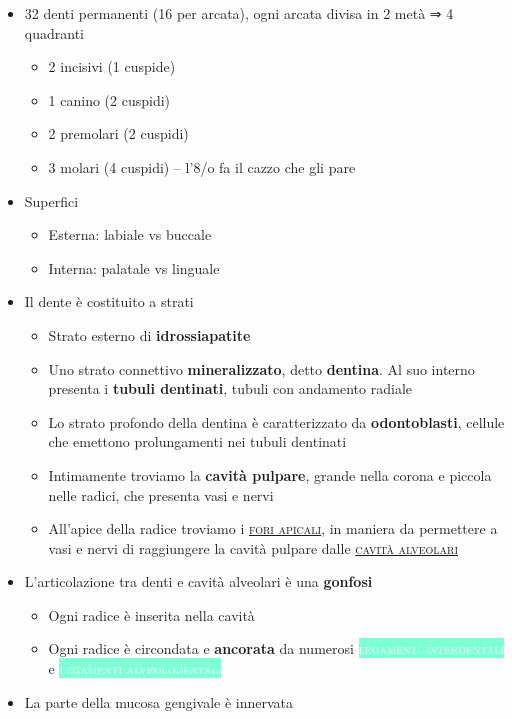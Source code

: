 \documentclass[italian,]{article}
\providecommand{\tightlist}{%
  \setlength{\itemsep}{0pt}\setlength{\parskip}{0pt}}
\newcommand{\tol}[1]{\colorbox{Aquamarine}{\textcolor{white}{\textsc{#1}}}}
\renewcommand{\a}[1]{\underline{\textsc{#1}}}
\begin{document}
\begin{itemize}
\tightlist
\item
  32 denti permanenti (16 per arcata), ogni arcata divisa in 2 metà ⇒ 4
  quadranti

  \begin{itemize}
  \tightlist
  \item
    2 incisivi (1 cuspide)
  \item
    1 canino (2 cuspidi)
  \item
    2 premolari (2 cuspidi)
  \item
    3 molari (4 cuspidi) -- l'8/o fa il cazzo che gli pare
  \end{itemize}
\item
  Superfici

  \begin{itemize}
  \tightlist
  \item
    Esterna: labiale vs buccale
  \item
    Interna: palatale vs linguale
  \end{itemize}
\item
  Il dente è costituito a strati

  \begin{itemize}
  \tightlist
  \item
    Strato esterno di \textbf{idrossiapatite}
  \item
    Uno strato connettivo \textbf{mineralizzato}, detto
    \textbf{dentina}. Al suo interno presenta i \textbf{tubuli
    dentinati}, tubuli con andamento radiale
  \item
    Lo strato profondo della dentina è caratterizzato da
    \textbf{odontoblasti}, cellule che emettono prolungamenti nei tubuli
    dentinati
  \item
    Intimamente troviamo la \textbf{cavità pulpare}, grande nella corona
    e piccola nelle radici, che presenta vasi e nervi
  \item
    All'apice della radice troviamo i \a{fori apicali}, in maniera da
    permettere a vasi e nervi di raggiungere la cavità pulpare dalle
    \a{cavità alveolari}
  \end{itemize}
\item
  L'articolazione tra denti e cavità alveolari è una \textbf{gonfosi}

  \begin{itemize}
  \tightlist
  \item
    Ogni radice è inserita nella cavità
  \item
    Ogni radice è circondata e \textbf{ancorata} da numerosi
    \tol{legamenti interdentali} e \tol{legamenti alveolodentali}
  \end{itemize}
\item
  La parte della mucosa gengivale è innervata


\end{itemize}
\end{document}
